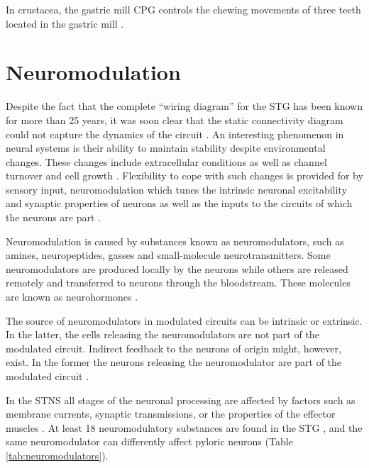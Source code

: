 In crustacea, the gastric mill \ac{CPG} controls the chewing movements of three teeth located in the gastric mill \cite{Rowat1993}.

\section{Neuromodulation}
Despite the fact that the complete ``wiring diagram'' for the \ac{STG} has been known for more than 25 years, it was soon clear that the static connectivity diagram could not capture the dynamics of the circuit \cite{Abbott1998}. An interesting phenomenon in neural systems is their ability to maintain stability despite environmental changes. These changes include extracellular conditions as well as channel turnover and cell growth \cite{LeMasson1993}.  Flexibility to cope with such changes is provided for by sensory input, neuromodulation which tunes the intrinsic neuronal excitability and synaptic properties of neurons as well as the inputs to the circuits of which the neurons are part \cite{Bucher2013, Johnson2005, Nadim2014}. 

Neuromodulation is caused by substances known as neuromodulators, such as amines, neuropeptides, gasses and small-molecule neurotransmitters. Some neuromodulators are produced locally by the neurons while others are released remotely and transferred to neurons through the bloodstream. These molecules are known as neurohormones \cite{Stein2009}. 

The source of neuromodulators in modulated circuits can be intrinsic or extrinsic. In the latter, the cells releasing the neuromodulators are not part of the modulated circuit. Indirect feedback to the neurons of origin might, however, exist. In the former the neurons releasing the neuromodulator are part of the modulated circuit \cite{Bucher2013}.

In the \ac{STNS} all stages of the neuronal processing are affected by factors such as membrane currents, synaptic transmissions, or the properties of the effector muscles \cite{Stein2009}. At least 18 neuromodulatory substances are found in the \ac{STG} \cite{Marder1987, Marder1995, Marder2001, Marder2007}, and the same neuromodulator can differently affect pyloric neurons \cite{Baro1997} (Table \ref{tab:neuromodulators}).

